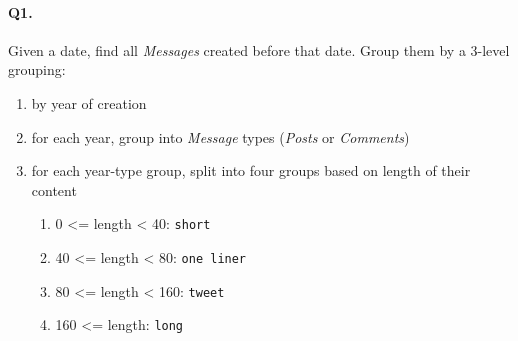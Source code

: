 \paragraph{Q1.}
Given a date, find all \emph{Messages} created before that date. Group
them by a 3-level grouping:
\begin{enumerate}
\def\labelenumi{\arabic{enumi}.}
\tightlist
\item
  by year of creation
\item
  for each year, group into \emph{Message} types (\emph{Posts} or
  \emph{Comments})
\item
  for each year-type group, split into four groups based on length of
  their content
  \begin{enumerate}
  \def\labelenumii{\arabic{enumii}.}
  \tightlist
  \item
    0 \textless{}= length \textless{} 40: \texttt{short}
  \item
    40 \textless{}= length \textless{} 80: \texttt{one\ liner}
  \item
    80 \textless{}= length \textless{} 160: \texttt{tweet}
  \item
    160 \textless{}= length: \texttt{long}
  \end{enumerate}
\end{enumerate}

